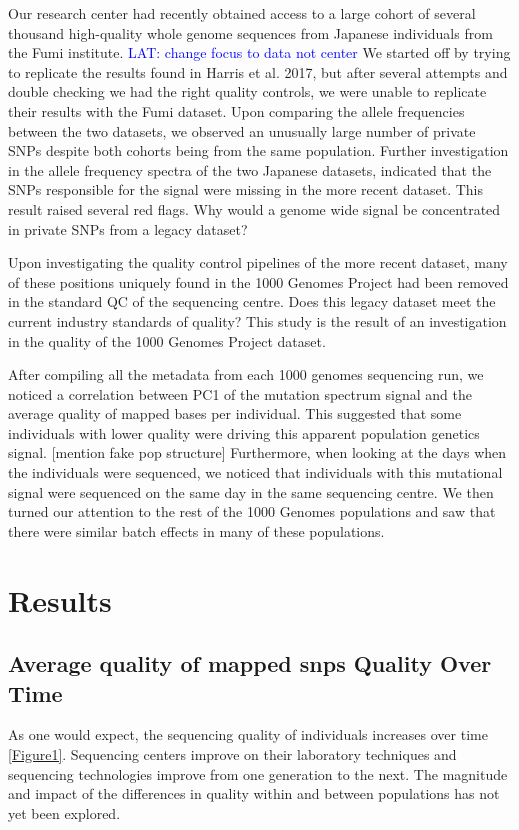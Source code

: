 \documentclass[12pt]{amsart}
\newcommand{\lat}[1]{\textcolor{blue}{LAT: #1}}
\begin{document}
Our research center had recently obtained access to a large cohort of several thousand high-quality whole genome sequences from Japanese individuals from the Fumi institute. \lat{change focus to data not center}
We started off by trying to replicate the results found in Harris et al. 2017, but after several attempts and double checking we had the right quality controls, we were unable to replicate their results with the Fumi dataset. 
Upon comparing the allele frequencies between the two datasets, we observed an unusually large number of private SNPs despite both cohorts being from the same population. 
Further investigation in the allele frequency spectra of the two Japanese datasets, indicated that the SNPs responsible for the signal were missing in the more recent dataset. 
This result raised several red flags. 
Why would a genome wide signal be concentrated in private SNPs from a legacy dataset?


Upon investigating the quality control pipelines of the more recent dataset, many of these positions uniquely found in the 1000 Genomes Project had been removed in the standard QC of the sequencing centre. 
Does this legacy dataset meet the current industry standards of quality? 
This study is the result of an investigation in the quality of the 1000 Genomes Project dataset. 


After compiling all the metadata from each 1000 genomes sequencing run, we noticed a correlation between PC1 of the mutation spectrum signal and the average quality of mapped bases per individual. 
This suggested that some individuals with lower quality were driving this apparent population genetics signal. [mention fake pop structure]
Furthermore, when looking at the days when the individuals were sequenced, we noticed that individuals with this mutational signal were sequenced on the same day in the same sequencing centre.
We then turned our attention to the rest of the 1000 Genomes populations and saw that there were similar batch effects in many of these populations.

			\section{Results}
\subsection{Average quality of mapped snps Quality Over Time}
As one would expect, the sequencing quality of individuals increases over time \ref{Figure1}. Sequencing centers improve on their laboratory techniques and sequencing technologies improve from one generation to the next. The magnitude and impact of the differences in quality within and between populations has not yet been explored. 
\end{document}
